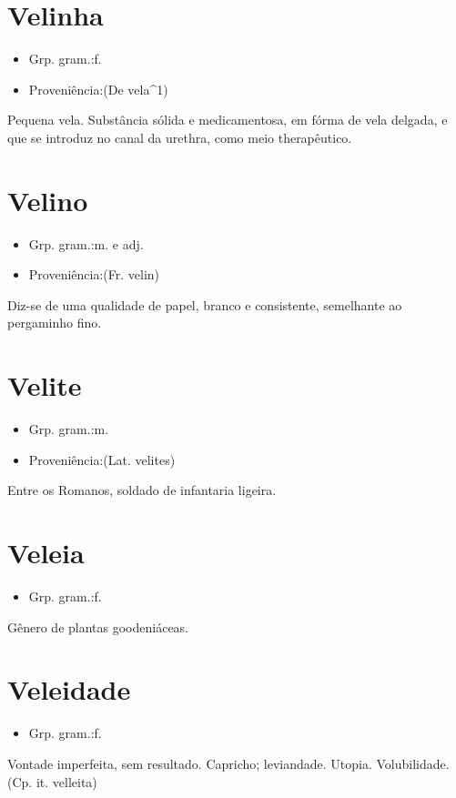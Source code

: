 \documentclass{article}
\begin{document}
\section{Velinha}
\begin{itemize}
\item {Grp. gram.:f.}
\end{itemize}
\begin{itemize}
\item {Proveniência:(De \textunderscore vela\textunderscore ^1)}
\end{itemize}
Pequena vela.
Substância sólida e medicamentosa, em fórma de vela delgada, e que se introduz no canal da urethra, como meio therapêutico.
\section{Velino}
\begin{itemize}
\item {Grp. gram.:m.  e  adj.}
\end{itemize}
\begin{itemize}
\item {Proveniência:(Fr. \textunderscore velin\textunderscore )}
\end{itemize}
Diz-se de uma qualidade de papel, branco e consistente, semelhante ao pergaminho fino.
\section{Velite}
\begin{itemize}
\item {Grp. gram.:m.}
\end{itemize}
\begin{itemize}
\item {Proveniência:(Lat. \textunderscore velites\textunderscore )}
\end{itemize}
Entre os Romanos, soldado de infantaria ligeira.
\section{Veleia}
\begin{itemize}
\item {Grp. gram.:f.}
\end{itemize}
Gênero de plantas goodeniáceas.
\section{Veleidade}
\begin{itemize}
\item {Grp. gram.:f.}
\end{itemize}
Vontade imperfeita, sem resultado.
Capricho; leviandade.
Utopia.
Volubilidade.
(Cp. it. \textunderscore velleita\textunderscore )
\end{document}

